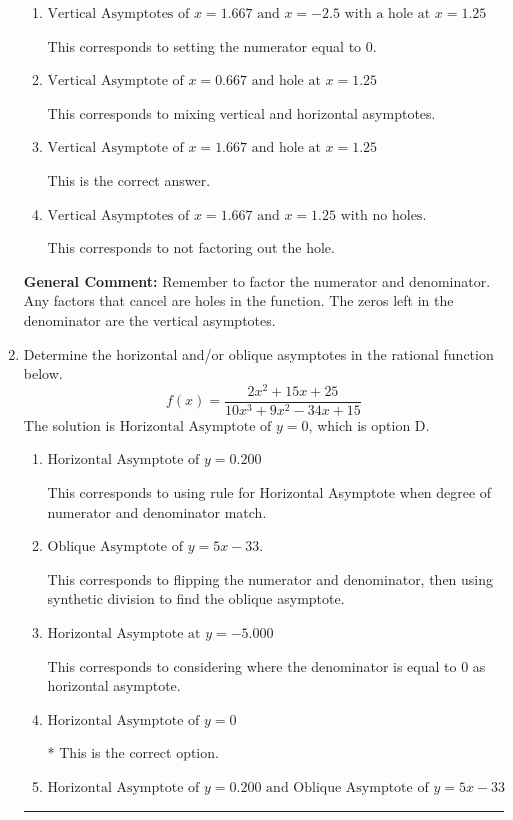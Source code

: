 \documentclass{extbook}[14pt]
\newcommand{\litem}[1]{\item #1

\rule{\textwidth}{0.4pt}}
\begin{document}
\begin{enumerate}
{\begin{enumerate}[label=\Alph*.]
This corresponds to considering where the denominator is equal to 0 as holes.
\item \( \text{Vertical Asymptotes of } x = 1.667 \text{ and } x = -2.5 \text{ with a hole at } x = 1.25 \)

This corresponds to setting the numerator equal to 0.
\item \( \text{Vertical Asymptote of } x = 0.667 \text{ and hole at } x = 1.25 \)

This corresponds to mixing vertical and horizontal asymptotes.
\item \( \text{Vertical Asymptote of } x = 1.667 \text{ and hole at } x = 1.25 \)

This is the correct answer.
\item \( \text{Vertical Asymptotes of } x = 1.667 \text{ and } x = 1.25 \text{ with no holes.} \)

This corresponds to not factoring out the hole.
\end{enumerate}

\textbf{General Comment:} Remember to factor the numerator and denominator. Any factors that cancel are holes in the function. The zeros left in the denominator are the vertical asymptotes.
}
\litem{
Determine the horizontal and/or oblique asymptotes in the rational function below.
\[ f(x) = \frac{2x^{2} +15 x + 25}{10x^{3} +9 x^{2} -34 x + 15} \]The solution is \( \text{Horizontal Asymptote of } y = 0 \), which is option D.\begin{enumerate}[label=\Alph*.]
\item \( \text{Horizontal Asymptote of } y = 0.200  \)

This corresponds to using rule for Horizontal Asymptote when degree of numerator and denominator match.
\item \( \text{Oblique Asymptote of } y = 5x -33. \)

This corresponds to flipping the numerator and denominator, then using synthetic division to find the oblique asymptote.
\item \( \text{Horizontal Asymptote at } y = -5.000 \)

This corresponds to considering where the denominator is equal to 0 as horizontal asymptote.
\item \( \text{Horizontal Asymptote of } y = 0 \)

* This is the correct option.
\item \( \text{Horizontal Asymptote of } y = 0.200 \text{ and Oblique Asymptote of } y = 5x -33 \)


\end{enumerate}}
\end{enumerate}
\end{document}
